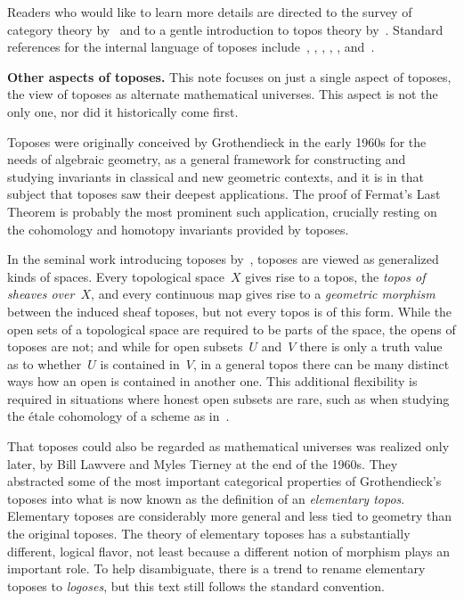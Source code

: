 \documentclass[graybox]{svmult}
\renewcommand{\_}{\mathpunct{.}\,}
\newcommand{\?}{\,{:}\,}
\renewcommand{\paragraph}[1]{\noindent\textbf{#1.}}
\begin{document}
Readers who would like to learn more details
are directed to the survey of category theory by~\cite{sep:category-theory}
and to a gentle introduction to topos theory
by~\cite{leinster:introduction}. Standard references for the internal
language of toposes include~\cite[Chapter~VI]{moerdijk-maclane:sheaves-logic},
\cite[Chapter~14]{goldblatt:topoi},
\cite{caramello:preliminaries}, \cite{streicher:ctcl}, \cite{shulman:categorical-logic},
\cite[Chapter~6]{borceux:handbook3} and~\cite[Part~D]{johnstone:elephant}.


\bigskip
\paragraph{Other aspects of toposes} This note focuses on just a single
aspect of toposes, the view of toposes as alternate mathematical universes.
This aspect is not the only one, nor did it historically come first.

Toposes were originally conceived by Grothendieck in the early 1960s for the
needs of algebraic geometry, as a general framework for constructing and
studying invariants in classical and new geometric contexts, and it is in that
subject that toposes saw their deepest applications. The proof of Fermat's Last
Theorem is probably the most prominent such application, crucially resting on
the cohomology and homotopy invariants provided by toposes.

In the seminal work introducing
toposes by~\cite{artin-grothendieck-verdier:topos}, toposes are viewed as
generalized kinds of spaces. Every topological space~$X$ gives rise to a topos,
the \emph{topos of sheaves over~$X$}, and every continuous map gives rise to a
\emph{geometric morphism} between the induced sheaf toposes, but not every
topos is of this form. While the open sets of a topological space are required
to be parts of the space, the opens of toposes are not; and while for open
subsets~$U$ and~$V$ there is only a truth value as to whether~$U$ is contained
in~$V$, in a general topos there can be many distinct ways how an open is
contained in another one. This additional flexibility is required in situations
where honest open subsets are rare, such as when studying the étale cohomology
of a scheme as in~\cite{milne:etale}.

That toposes could also be regarded as mathematical universes was realized only
later, by Bill Lawvere and Myles Tierney at the end of the 1960s. They abstracted some of
the most important categorical properties of Grothendieck's toposes into what
is now known as the definition of an \emph{elementary topos}. Elementary
toposes are considerably more general and less tied to geometry than the
original toposes. The theory of elementary toposes has a substantially
different, logical flavor, not least because a different notion of morphism
plays an important role. To help disambiguate, there is a trend to rename
elementary toposes to \emph{logoses}, but this text still follows the standard
convention.
\end{document}
